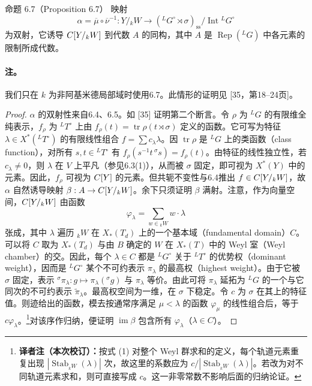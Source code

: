 \begin{originaltheorem}{命题 6.7（Proposition 6.7）}
映射
\[
 \alpha=\overline\mu\circ\overline\nu^{-1}:Y/{}_kW\longrightarrow
 ({}^LG^\circ\rtimes\sigma)_{\mathrm{ss}}/\operatorname{Int}{}^LG^\circ
\]
为双射，它诱导 $C[Y/{}_kW]$ 到代数 $A$ 的同构，其中 $A$ 是 $\operatorname{Rep}({}^LG)$ 中各元素的限制所成代数。
\end{originaltheorem}
\paragraph*{注。} 我们只在 $k$ 为非阿基米德局部域时使用6.7。此情形的证明见 [35，第18--24页]。

\begin{proof}
$\alpha$ 的双射性来自6.4、6.5。如 [35] 证明第二个断言。令 $\rho$ 为 ${}^LG$ 的有限维全纯表示，$f_\rho$ 为 ${}^LT^\circ$ 上由 $f_\rho(t)=\operatorname{tr}\rho(t\rtimes\sigma)$ 定义的函数。它可写为特征 $\lambda\in X^*({}^LT^\circ)$ 的有限线性组合 $f=\sum c_\lambda\lambda$。因 $\operatorname{tr}\rho$ 是 ${}^LG$ 上的类函数（class function），对所有 $s,t\in{}^LT^\circ$ 有 $f_\rho(s^{-1}t\,{}^\sigma s)=f_\rho(t)$。由特征的线性独立性，若 $c_\lambda\neq0$，则 $\lambda$ 在 $V$ 上平凡（参见6.3(1)），从而被 $\sigma$ 固定，即可视为 $X^*(Y)$ 中的元素。因此，$f_\rho$ 可视为 $C[Y]$ 的元素。但共轭不变性与6.4推出 $f\in C[Y/{}_kW]$，故 $\alpha$ 自然诱导映射 $\beta:A\to C[Y/{}_kW]$。余下只须证明 $\beta$ 满射。注意，作为向量空间，$C[Y/{}_kW]$ 由函数
\begin{equation}
 \varphi_\lambda=\sum_{w\in{}_kW}w\cdot\lambda\tag{1}
\end{equation}
张成，其中 $\lambda$ 遍历 ${}_kW$ 在 $X_*(T_d)$ 上的一个基本域（fundamental domain）$C$。可以将 $C$ 取为 $X_*(T_d)$ 与由 $B$ 确定的 $W$ 在 $X_*(T)$ 中的 Weyl 室（Weyl chamber）的交。因此，每个 $\lambda\in C$ 都是 ${}^LG^\circ$ 关于 ${}^LT^\circ$ 的优势权（dominant weight），因而是 ${}^LG^\circ$ 某个不可约表示 $\pi_\lambda$ 的最高权（highest weight）。由于它被 $\sigma$ 固定，表示 ${}^\sigma\pi_\lambda:g\mapsto\pi_\lambda({}^\sigma g)$ 与 $\pi_\lambda$ 等价。由此可将 $\pi_\lambda$ 延拓为 ${}^LG$ 的一个与它同次的不可约表示 $\widetilde\pi_\lambda$。最高权空间为一维，在 $\sigma$ 下稳定。令 $c$ 为 $\sigma$ 在其上的特征值。则迹给出的函数，模去按通常序满足 $\mu<\lambda$ 的函数 $\varphi_\mu$ 的线性组合后，等于 $c\varphi_\lambda$。\footnote{\textbf{译者注（本次校订）：}按式 (1) 对整个 Weyl 群求和的定义，每个轨道元素重复出现 $|\operatorname{Stab}_{{}_kW}(\lambda)|$ 次，故这里的系数应为 $c/|\operatorname{Stab}_{{}_kW}(\lambda)|$。若改为对不同轨道元素求和，则可直接写成 $c$。这一非零常数不影响后面的归纳论证。}对该序作归纳，便证明 $\operatorname{im}\beta$ 包含所有 $\varphi_\lambda$（$\lambda\in C$）。
\end{proof}

